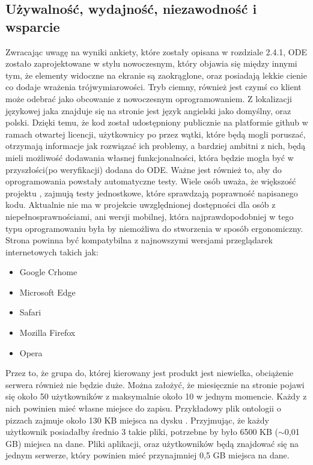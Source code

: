 \documentclass[a4paper,12pt, twoside]{book} %
\begin{document}
\subsection{Używalność, wydajność, niezawodność i wsparcie} 
Zwracając uwagę na wyniki ankiety, które zostały opisana w rozdziale 2.4.1, ODE zostało zaprojektowane w stylu nowoczesnym, który objawia się między innymi tym, że elementy widoczne na ekranie są zaokrąglone, oraz posiadają lekkie cienie co dodaje wrażenia trójwymiarowości. Tryb ciemny, również jest czymś co klient może odebrać jako obcowanie z nowoczesnym oprogramowaniem. Z lokalizacji językowej jaka znajduje się na stronie jest język angielski jako domyślny, oraz polski. Dzięki temu, że kod został udostępniony publicznie na platformie github \cite{github} w ramach otwartej licencji, użytkownicy po przez wątki, które będą mogli poruszać, otrzymają informacje jak rozwiązać ich problemy, a bardziej ambitni z nich, będą mieli możliwość dodawania własnej funkcjonalności, która będzie mogła być w przyszłości(po weryfikacji) dodana do ODE. Ważne jest również to, aby do oprogramowania powstały automatyczne testy. Wiele osób uważa, że większość projektu , zajmują testy jednostkowe, które sprawdzają poprawność napisanego kodu. Aktualnie nie ma w projekcie uwzględnionej dostępności dla osób z niepełnosprawnościami, ani wersji mobilnej, która najprawdopodobniej w tego typu oprogramowaniu była by niemożliwa do stworzenia w sposób ergonomiczny. Strona powinna być kompatybilna z najnowszymi wersjami przeglądarek internetowych takich jak:
 \begin{itemize}
 	\item Google Crhome
 	\item Microsoft Edge
 	\item Safari
 	\item Mozilla Firefox
 	\item Opera
 \end{itemize}


Przez to, że grupa do, której kierowany jest produkt jest niewielka, obciążenie serwera również nie będzie duże. Można założyć, że miesięcznie na stronie pojawi się około 50 użytkowników z maksymalnie około 10 w jednym momencie. Każdy z nich powinien mieć własne miejsce do zapisu. Przykładowy plik ontologii o pizzach zajmuje około 130 KB miejsca na dysku \cite{pizza}. Przyjmując, że każdy użytkownik posiadałby średnio 3 takie pliki, potrzebne by było 6500 KB ($\sim$0,01 GB) miejsca na dane. Pliki aplikacji, oraz użytkowników będą znajdować się na jednym serwerze, który powinien mieć przynajmniej 0,5 GB miejsca na dane.
\end{document}
